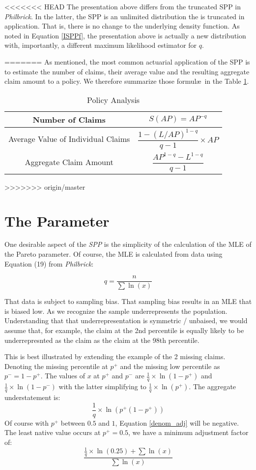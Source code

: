 \documentclass[]{article} %
\newcommand{\philbrick}{\textit{Philbrick}}
\begin{document}
<<<<<<< HEAD
The presentation above differs from the truncated SPP in \philbrick. In the latter, the SPP is an unlimited distribution the is truncated in application. That is, there is no change to the underlying density function. As noted in Equation \ref{ISPPf}, the presentation above is actually a new distribution with, importantly, a different maximum likelihood estimator for $q$.


=======
As mentioned, the most common actuarial application of the SPP is to estimate the number of claims, their average value and the resulting aggregate claim amount to a policy. We therefore summarize those formul\ae~in the Table \ref{tbl:PolicyFormulas}.
\begin{table}[h!]
	\centering
	\begin{tabular}[h]{cc}
		\toprule
		Number of Claims & $S(AP) = AP^{-q}$\\ \midrule
		Average Value of Individual Claims & $\dfrac{1 - (L/AP)^{1-q}}{q-1} \times AP$\\ \midrule
		Aggregate Claim Amount & $\dfrac{AP^{1-q} - L^{1-q}}{q-1}$\\
		\bottomrule
	\end{tabular}
	\caption{Policy Analysis}\label{tbl:PolicyFormulas}			
\end{table}
 
>>>>>>> origin/master
\section{The Parameter}
One desirable aspect of the \textit{SPP} is the simplicity of the calculation of the MLE of the Pareto parameter. Of course, the MLE is calculated from data using Equation (19) from \philbrick:

\begin{equation}\label{mle}
q = \frac{n}{\sum \ln(x)}
\end{equation}


That data is subject to sampling bias. That sampling bias results in an MLE that is biased low. As we recognize the sample underrepresents the population. Understanding that that underrepresentation is symmetric / unbaised, we would assume that, for example, the claim at the 2nd percentile is equally likely to be underrepresnted as the claim as the claim at the 98th percentile. 

This is best illustrated by extending the example of the 2 missing claims. Denoting the missing percentile at $p^+$ and the missing low percentile as $p^- = 1 - p^+$. The values of $x$ at $p^+$ and $p^-$ are $\frac{1}{q}\times\ln(1-p^{+})$ and $\frac{1}{q}\times\ln(1-p^{-})$ with the latter simplifying to $\frac{1}{q}\times\ln(p^{+})$. The aggregate understatement is:
\begin{equation}\label{denom_adj}
\frac{1}{q}\times\ln(p^{+}(1-p^{+}))
\end{equation}
Of course with $p^{+}$ between $0.5$ and $1$, Equation \ref{denom_adj} will be negative. The least native value occurs at $p^{+} = 0.5$, we have a minimum adjustment factor of:
 \begin{equation}\label{denom_adj_fctr}
 \frac{\frac{1}{q}\times\ln(0.25) + \sum \ln(x)}{\sum \ln(x)}
 \end{equation}
\end{document}
